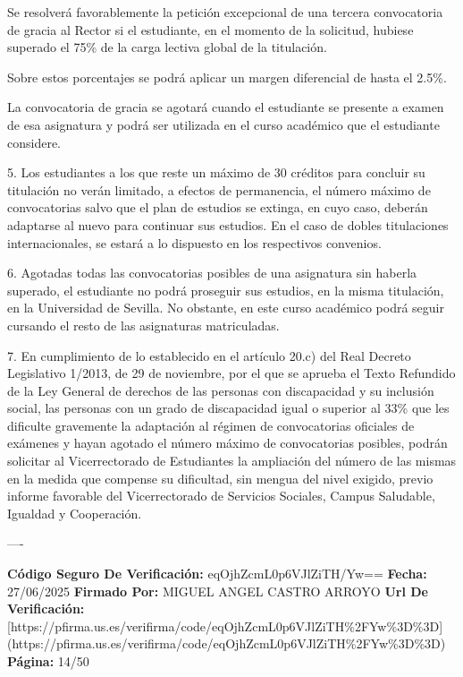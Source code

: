 \documentclass{article}
\begin{document}
\begin{itemize}
\begin{itemize}
\begin{scriptsize}
                  Se resolverá favorablemente la petición excepcional de una tercera convocatoria de gracia al Rector si el estudiante, en el momento de la solicitud, hubiese superado el 75\% de la carga lectiva global de la titulación.

                  Sobre estos porcentajes se podrá aplicar un margen diferencial de hasta el 2.5\%.

                  La convocatoria de gracia se agotará cuando el estudiante se presente a examen de esa asignatura y podrá ser utilizada en el curso académico que el estudiante considere.

                  5. Los estudiantes a los que reste un máximo de 30 créditos para concluir su titulación no verán limitado, a efectos de permanencia, el número máximo de convocatorias salvo que el plan de estudios se extinga, en cuyo caso, deberán adaptarse al nuevo para continuar sus estudios. En el caso de dobles titulaciones internacionales, se estará a lo dispuesto en los respectivos convenios.

                  6. Agotadas todas las convocatorias posibles de una asignatura sin haberla superado, el estudiante no podrá proseguir sus estudios, en la misma titulación, en la Universidad de Sevilla. No obstante, en este curso académico podrá seguir cursando el resto de las asignaturas matriculadas.

                  7. En cumplimiento de lo establecido en el artículo 20.c) del Real Decreto Legislativo 1/2013, de 29 de noviembre, por el que se aprueba el Texto Refundido de la Ley General de derechos de las personas con discapacidad y su inclusión social, las personas con un grado de discapacidad igual o superior al 33\% que les dificulte gravemente la adaptación al régimen de convocatorias oficiales de exámenes y hayan agotado el número máximo de convocatorias posibles, podrán solicitar al Vicerrectorado de Estudiantes la ampliación del número de las mismas en la medida que compense su dificultad, sin mengua del nivel exigido, previo informe favorable del Vicerrectorado de Servicios Sociales, Campus Saludable, Igualdad y Cooperación.

                  ----

                  \textbf{Código Seguro De Verificación:} eqOjhZcmL0p6VJlZiTH/Yw==
                  \textbf{Fecha:} 27/06/2025
                  \textbf{Firmado Por:} MIGUEL ANGEL CASTRO ARROYO
                  \textbf{Url De Verificación:} [https://pfirma.us.es/verifirma/code/eqOjhZcmL0p6VJlZiTH\%2FYw\%3D\%3D](https://pfirma.us.es/verifirma/code/eqOjhZcmL0p6VJlZiTH\%2FYw\%3D\%3D)
                  \textbf{Página:} 14/50


\end{scriptsize}
\end{itemize}
\end{itemize}
\end{document}
